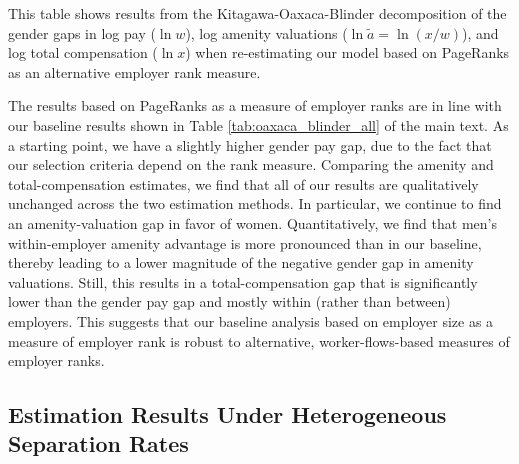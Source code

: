%
\begin{table}[htbp!]
    \caption{Kitagawa-Oaxaca-Blinder decompositions---alternative employer ranks based on PageRanks\label{tab:oaxaca_blinder_pageranks}}
    \resizebox{\textwidth}{!}{%
    
    }
    \begin{tablenotes}
        \footnotesize
        This table shows results from the Kitagawa-Oaxaca-Blinder decomposition of the gender gaps in log pay ($\ln w$), log amenity valuations ($\ln \tilde{a} = \ln(x/w)$), and log total compensation ($\ln x$) when re-estimating our model based on PageRanks as an alternative employer rank measure. %
    \end{tablenotes}
    \begin{tablenotes}[Source]
        \sourcemodel%
    \end{tablenotes}
\end{table}
%

The results based on PageRanks as a measure of employer ranks are in line with our baseline results shown in Table \ref{tab:oaxaca_blinder_all} of the main text. As a starting point, we have a slightly higher gender pay gap, due to the fact that our selection criteria depend on the rank measure. Comparing the amenity and total-compensation estimates, we find that all of our results are qualitatively unchanged across the two estimation methods. In particular, we continue to find an amenity-valuation gap in favor of women. Quantitatively, we find that men's within-employer amenity advantage is more pronounced than in our baseline, thereby leading to a lower magnitude of the negative gender gap in amenity valuations. Still, this results in a total-compensation gap that is significantly lower than the gender pay gap and mostly within (rather than between) employers. This suggests that our baseline analysis based on employer size as a measure of employer rank is robust to alternative, worker-flows-based measures of employer ranks.


\subsection{Estimation Results Under Heterogeneous Separation Rates\label{app:hetero_delta_results}}

